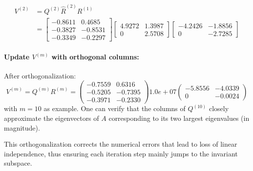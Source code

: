 \documentclass[12pt]{article}
\begin{document}
$$
\begin{aligned}
    V^{(2)}& =Q^{(2)} \hat{R}^{(2)}R^{(1)}\\
            & = \begin{bmatrix}
-0.8611 & 0.4685 \\
-0.3827 & -0.8531 \\
-0.3349 & -0.2297
\end{bmatrix} \begin{bmatrix}
4.9272 & 1.3987 \\
0 & 2.5708
\end{bmatrix}\begin{bmatrix}
-4.2426 & -1.8856 \\
0 & -2.7285
\end{bmatrix}
\end{aligned}
$$

\paragraph{Update $V^{(m)}$ with orthogonal columns:} 

After orthogonalization:
$$
V^{(m)}=Q^{(m)} R^{(m)} =\begin{pmatrix}
-0.7559 & 0.6316 \\
-0.5205 & -0.7395 \\
-0.3971 & -0.2330
\end{pmatrix} 1.0e+07 \begin{pmatrix}
-5.8556 & -4.0339 \\
0 & -0.0024
\end{pmatrix}
$$
with $m = 10$ as example. One can verify that the columns of $Q^{(10)}$ closely approximate the eigenvectors of $A$ corresponding to its two largest eigenvalues (in magnitude).

This orthogonalization corrects the numerical errors that lead to loss of linear independence, thus ensuring each iteration step mainly jumps to the invariant subspace.

\end{document}
